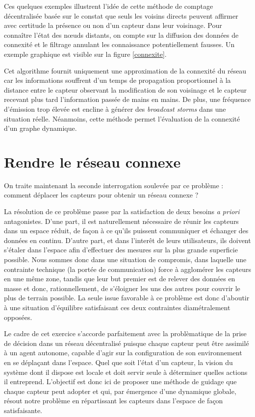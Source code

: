 \documentclass[10pt]{article}
\begin{document}
\begin{multicols}{2}
Ces quelques exemples illustrent l'idée de cette méthode de comptage
décentralisée basée sur le constat que seuls les voisins directs
peuvent affirmer avec certitude la présence ou non d'un capteur dans
leur voisinage. Pour connaître l'état des n\oe uds distants, on compte
sur la diffusion des données de connexité et le filtrage annulant les
connaissance potentiellement fausses. Un exemple graphique est visible
sur la figure \ref{connexite}.

Cet algorithme fournit uniquement une approximation de la connexité du
réseau car les informations souffrent d'un temps de propagation
proportionnel à la distance entre le capteur observant la modification
de son voisinage et le capteur recevant plus tard l'information passée
de mains en mains. De plus, une fréquence d'émission trop élevée est
encline à générer des \textit{broadcast storms} dans une situation
réelle. Néanmoins, cette méthode permet l'évaluation de la connexité
d'un graphe dynamique.

\section{Rendre le réseau connexe}

On traite maintenant la seconde interrogation soulevée par ce problème
: comment déplacer les capteurs pour obtenir un réseau connexe ?

La résolution de ce problème passe par la satisfaction de deux besoins
\textit{a priori} antagonistes. D'une part, il est naturellement
nécessaire de réunir les capteurs dans un espace réduit, de façon à ce
qu'ils puissent communiquer et échanger des données en
continu. D'autre part, et dans l'interêt de leurs utilisateurs, ils
doivent s'étaler dans l'espace afin d'effectuer des mesures sur la
plus grande superficie possible. Nous sommes donc dans une situation
de compromis, dans laquelle une contrainte technique (la portée de
communication) force à agglomérer les capteurs en une même zone,
tandis que leur but premier est de relever des données en masse et
donc, rationnellement, de s'éloigner les uns des autres pour couvrir
le plus de terrain possible. La seule issue favorable à ce problème
est donc d'aboutir à une situation d'équilibre satisfaisant ces deux
contraintes diamétralement opposées.

Le cadre de cet exercice s'accorde parfaitement avec la problèmatique
de la prise de décision dans un réseau décentralisé puisque chaque
capteur peut être assimilé à un agent autonome, capable d'agir sur la
configuration de son environnement en se déplaçant dans l'espace. Quel
que soit l'état d'un capteur, la vision du système dont il dispose est
locale et doit servir seule à déterminer quelles actions il
entreprend. L'objectif est donc ici de proposer une méthode de guidage
que chaque capteur peut adopter et qui, par émergence d'une dynamique
globale, résout notre problème en répartissant les capteurs dans
l'espace de façon satisfaisante.


\end{multicols}
\end{document}
